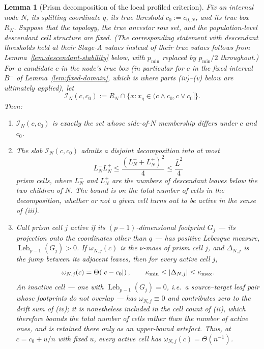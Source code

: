 \documentclass[11pt]{article}
\theoremstyle{plain}
\newtheorem{lemma}[theorem]{Lemma}
\theoremstyle{definition}
\theoremstyle{remark}
\DeclarePairedDelimiter{\abs}{\lvert}{\rvert}
\begin{document}
\begin{lemma}[Prism decomposition of the local profiled criterion]
\label{lem:prism-profile}
Fix an internal node \(N\), its splitting coordinate \(q\), its true threshold
\(c_0:=c_{0,N}\), and its true box \(R_N\).  Suppose that the topology,
the true ancestor row set, and the population-level descendant cell structure
are fixed.  (The corresponding statement with descendant thresholds held at
their Stage-A values instead of their true values follows from
Lemma~\ref{lem:descendant-stability} below, with \(p_{\min}\) replaced by
\(p_{\min}/2\) throughout.)  For a candidate \(c\) in the node's true box (in particular for
\(c\) in the fixed interval \(B^-\) of Lemma~\ref{lem:fixed-domain},
which is where parts (iv)--(v) below are ultimately applied), let
\[
  \mathcal I_N(c,c_0)
  :=
  R_N\cap
  \bigl\{x:x_q\in(c\wedge c_0,c\vee c_0]\bigr\}.
\]
Then:

\begin{enumerate}[label=(\roman*),leftmargin=*]
  \item \(\mathcal I_N(c,c_0)\) is exactly the set whose side-of-\(N\)
  membership differs under \(c\) and \(c_0\).

  \item The slab \(\mathcal I_N(c,c_0)\) admits a disjoint decomposition into
  at most
  \[
    L_N^-L_N^+
    \le \frac{(L_N^-+L_N^+)^2}{4}
    \le \frac{\bar L^2}{4}
  \]
  prism cells, where \(L_N^-\) and \(L_N^+\) are the numbers of
  descendant leaves below the two children of \(N\). The bound is on the
  total number of cells in the decomposition, whether or not a given cell
  turns out to be active in the sense of (iii).

  \item Call prism cell \(j\) \emph{active} if its \((p-1)\)-dimensional
  footprint \(G_j\) --- its projection onto the coordinates other than
  \(q\) --- has positive Lebesgue measure,
  \(\operatorname{Leb}_{p-1}(G_j)>0\).
  If \(\omega_{N,j}(c)\) is the \(\nu\)-mass of prism cell \(j\), and
  \(\Delta_{N,j}\) is the jump between its adjacent leaves, then for every
  active cell \(j\),
  \[
    \omega_{N,j}(c)=\Theta\!\left(\abs{c-c_0}\right),
    \qquad
    \kappa_{\min}\le\abs{\Delta_{N,j}}\le\kappa_{\max}.
  \]
  An inactive cell --- one with \(\operatorname{Leb}_{p-1}(G_j)=0\), i.e.\ a
  source--target leaf pair whose footprints do not overlap --- has
  \(\omega_{N,j}\equiv0\) and contributes zero to the drift sum of (iv); it is
  nonetheless included in the cell count of (ii), which therefore bounds the
  total number of cells rather than the number of active ones, and is retained
  there only as an upper-bound artefact.
  Thus, at \(c=c_0+u/n\) with fixed \(u\), every active cell
  has \(\omega_{N,j}(c)=\Theta(n^{-1})\).


\end{enumerate}
\end{lemma}
\end{document}
